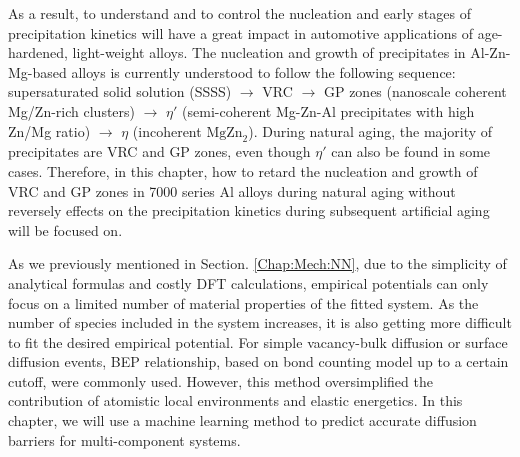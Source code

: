 As a result, to understand and to control the nucleation and early stages of precipitation kinetics will have a great impact in automotive applications of age-hardened, light-weight alloys. \cite{deschamps1998influence,banhart2011kinetics,liang2012kinetics,deschamps2014precipitation} The nucleation and growth of precipitates in Al-Zn-Mg-based alloys is currently understood to follow the following sequence: supersaturated solid solution (SSSS) $\rightarrow$ \acf{VRC} $\rightarrow$ \acf{GP} zones (nanoscale coherent Mg/Zn-rich clusters) $\rightarrow$ $\eta'$ (semi-coherent Mg-Zn-Al precipitates with high Zn/Mg ratio) $\rightarrow$ $\eta$ (incoherent $\text{MgZn}_\text{2}$). \cite{ragueneau2000review,deschamps2014precipitation,berg2001gp,chung2018transmission} During natural aging, the majority of precipitates are \ac{VRC} and \ac{GP} zones, even though $\eta'$ can also be found in some cases. \cite{mukhopadhyay1994guinier} Therefore, in this chapter, how to retard the nucleation and growth of \ac{VRC} and \ac{GP} zones in 7000 series Al alloys during natural aging without reversely effects on the precipitation kinetics during subsequent artificial aging will be focused on.


As we previously mentioned in Section. \ref{Chap:Mech:NN}, due to the simplicity of analytical formulas and costly \ac{DFT} calculations, empirical potentials can only focus on a limited number of material properties of the fitted system. As the number of species included in the system increases, it is also getting more difficult to fit the desired empirical potential. For simple vacancy-bulk diffusion or surface diffusion events, \acf{BEP} relationship, based on bond counting model up to a certain cutoff, were commonly used. \cite{soisson1996monte, soisson2010atomistic} However, this method oversimplified the contribution of atomistic local environments and elastic energetics. In this chapter, we will use a machine learning method to predict accurate diffusion barriers for multi-component systems.

